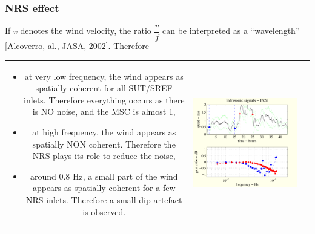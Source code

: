 \documentclass[handout,9pt]{beamer}
\begin{document}
\begin{frame}
\frametitle{NRS effect}

If $v$ denotes the wind velocity, the ratio $\dfrac{v}{f}$ can be interpreted as a ``wavelength'' [Alcoverro, al., JASA,
2002]. Therefore


\begin{tabular}{clc}
\hspace{-1cm}
\begin{minipage}{6cm}
\begin{itemize}
\item
{\color{red}at very low frequency}, 
{ the wind appears as spatially coherent for all SUT/SREF inlets. Therefore everything occurs as there is NO noise, and the MSC is almost 1},
\item
{\color{red}at high frequency},  
{the wind appears as spatially NON coherent. Therefore the NRS plays its role to reduce the noise},
\item
{\color{red}around $0.8$ Hz}, 
{a small part of the wind appears as  spatially coherent for a few NRS inlets. Therefore a small dip artefact is observed}.
\end{itemize}
\end{minipage}
&
\begin{minipage}{7.5cm}
\includegraphics[scale=0.45]{twospeedster.pdf}
\end{minipage}
\end{tabular}
\end{frame}
\end{document}

